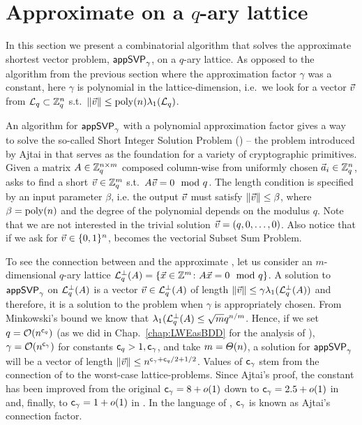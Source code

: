 \section{Approximate \SVP on a $q$-ary lattice} 
\label{sec:ApproxQary}

In this section we present a combinatorial algorithm that solves the approximate shortest vector problem, $\textsf{appSVP}_{\gamma}$, on a $q$-ary lattice. As opposed to the algorithm from the previous section where the approximation factor $\gamma$ was a constant, here $\gamma$ is polynomial in the lattice-dimension, i.e.\ we look for a vector $\vvec$ from $\mathcal{L}_q \subset {{\mathbb Z}}_q^n$ s.t.\ $\| \vvec \| \leq \poly(n) \lambda_1(\qLat)$.

An algorithm for $\textsf{appSVP}_{\gamma}$ with a polynomial approximation factor gives a way to solve the so-called Short Integer Solution Problem (\SIS) -- the problem introduced by Ajtai in \cite{STOC:Ajtai96} that serves as the foundation for a variety of cryptographic primitives. Given a matrix $A \in {{\mathbb Z}}_q^{n \times m}$ composed column-wise from uniformly chosen $\vec a_i \in {{\mathbb Z}}_q^n$, \SIS asks to find a short $\vvec \in \Z_q^m$ s.t.\ $\AMat \vvec = 0 \mod q$. The length condition is specified by an input parameter $\beta$, i.e. the output $\vvec$ must satisfy $\| \vvec \| \leq \beta$, where $ \beta=\mathrm{poly}(n)$ and the degree of the polynomial depends on the modulus $q$. Note that we are not interested in the trivial solution $\vvec = (q, 0, \ldots, 0)$. Also notice that if we ask for $\vvec \in \ZO{n}$, \SIS becomes the vectorial Subset Sum Problem.

To see the connection between \SIS and the approximate \SVP, let us consider an $m$-dimensional $q$-ary lattice $\mathcal{L}_q^{\perp}(A) = \{ \vec x \in {{\mathbb Z}}^m \colon A \vec x = 0 \mod q \}$. A solution to $\textsf{appSVP}_{\gamma}$ on $\mathcal{L}_q^{\perp}(A)$ is a vector $\vvec \in \qLATTp(\AMat)$ of length $\|\vvec \| \leq \gamma \lambda_1(\qLATTp(\AMat))$ and therefore, it is a solution to the \SIS problem when $\gamma$ is appropriately chosen. From Minkowski's bound we know that $\lambda_1(\mathcal{L}_q^{\perp}(A) \leq \sqrt{m} q^{n/m}$. Hence, if we set $q=\mathcal{O}(n^{\mathsf{c}_q})$ (as we did in Chap.~\ref{chap:LWEasBDD} for the analysis of \LWE), $\gamma  = \mathcal{O}(n^{\mathsf{c}_{\gamma}})$ for constants $\mathsf{c}_q>1, \mathsf{c}_{\gamma}$, and take $m = \varTheta(n)$, a solution for $\textsf{appSVP}_{\gamma}$ will be a vector of length $\|\vvec \| \leq n^{\cg + \cq/2 + 1/2}$. Values of $\mathsf{c}_{\gamma}$ stem from the connection of \SIS to the worst-case lattice-problems. Since Ajtai's proof, the constant has been improved from the original $\mathsf{c}_{\gamma}=8+o(1)$ \cite{STOC:Ajtai96} down to $\mathsf{c}_{\gamma}=2.5+o(1)$ in \cite{Mic05} and, finally, to $\mathsf{c}_{\gamma}=1+o(1)$ in \cite{FOCS:MicReg04}. In the language of \SIS, $\mathsf{c}_{\gamma}$ is known as Ajtai's connection factor.


